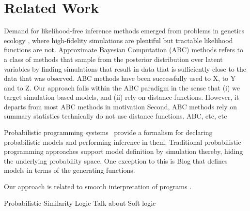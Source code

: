 \section{Related Work}

Demand for likelihood-free inference methods emerged from problems in genetics ecology \cite{}, where high-fidelity simulations are plentiful but tractable likelihood functions are not.
Approximate Bayesian Computation (ABC) methods refers to a class of methods that sample from the posterior distribution over latent variables by finding simulations that result in data that is sufficiently close to the data that was observed.
ABC methods have been successfully used to X, to Y and to Z.
Our approach falls within the ABC paradigm in the sense that (i) we target  simulation based models, and (ii) rely on distance functions.
However, it departs from most ABC methods in motivation
Second, ABC methods rely on summary statistics technically do not use distance functions.
ABC, etc, etc 

Probabilistic programming systems~\citep{milch20071, wood2014new,mansinghka2014venture,goodman2008church,carpenter2017stan} provide a formalism
for declaring probabilistic models and performing inference
in them. Traditional probabilistic programming approaches support model definition by simulation thereby, hiding the underlying probability space. 
One exception to this is Blog \citep{milch20071} 
that defines models in terms of the generating functions.

Our approach is related to smooth interpretation of programs \citep{chaudhuri2010smooth}.

Probabilistic Similarity Logic \cite{brocheler2012probabilistic,kimmig2012short}
Talk about Soft logic